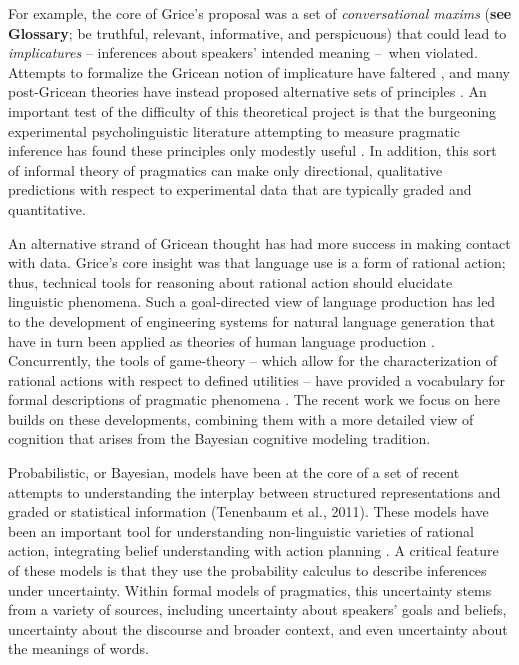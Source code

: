 \documentclass[]{elsarticle}
\begin{document}
For example, the core of Grice's proposal was a set of
\emph{conversational maxims} (\textbf{see Glossary}; be truthful,
relevant, informative, and perspicuous) that could lead to
\emph{implicatures} -- inferences about speakers' intended meaning
--~when violated. Attempts to formalize the Gricean notion of
implicature have faltered \cite[e.g.,][]{hirschberg1985}, and many
post-Gricean theories have instead proposed alternative sets of
principles \citep{sperber1986,levinson2000}. An important test
of the difficulty of this theoretical project is that the burgeoning
experimental psycholinguistic literature attempting to measure pragmatic
inference has found these principles only modestly useful \citep{breheny2006,huang2009,noveck2008}. In addition, this sort of informal theory of pragmatics can make only directional,
qualitative predictions with respect to experimental data that are typically graded and
quantitative.

An alternative strand of Gricean thought has had more success in making
contact with data. Grice's core insight was that language use is a form
of rational action; thus, technical tools for reasoning about rational
action should elucidate linguistic phenomena. Such a goal-directed view
of language production has led to the development of engineering systems
for natural language generation \citep{dale1995} that have in turn
been applied as theories of human language production \citep[e.g.,][]{viethen2006}. Concurrently, the tools of game-theory -- which allow for
the characterization of rational actions with respect to defined
utilities -- have provided a vocabulary for formal descriptions of
pragmatic phenomena \citep[e.g.,][]{benz2006,jager2008}. The recent work we focus on
here builds on these developments, combining them with a more detailed
view of cognition that arises from the Bayesian cognitive modeling
tradition.

Probabilistic, or Bayesian, models have been at the core of a set of
recent attempts to understanding the interplay between structured
representations and graded or statistical information (Tenenbaum et al.,
2011). These models have been an important tool for understanding
non-linguistic varieties of rational action, integrating belief
understanding with action planning \citep{baker2009}. A
critical feature of these models is that they use the probability
calculus to describe inferences under uncertainty. Within formal models
of pragmatics, this uncertainty stems from a variety of sources,
including uncertainty about speakers' goals and beliefs, uncertainty
about the discourse and broader context, and even uncertainty about the
meanings of words.
\end{document}
